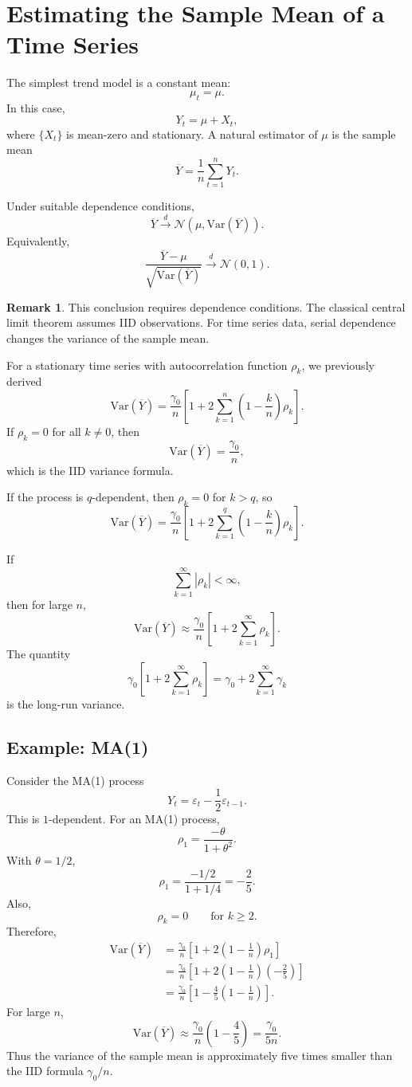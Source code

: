 \documentclass[12pt,oneside]{book}
\numberwithin{equation}{section}
\theoremstyle{definition}
\newtheorem{remark}{Remark}[section]
\theoremstyle{plain}
\theoremstyle{remark}
\newcommand{\Var}{\mathrm{Var}}
\newcommand{\convd}{\overset{d}{\to}}
\newcommand{\Normal}{\mathcal{N}}
\begin{document}
\section{Estimating the Sample Mean of a Time Series}

The simplest trend model is a constant mean:
\[
\mu_t=\mu.
\]
In this case,
\[
Y_t=\mu+X_t,
\]
where $\{X_t\}$ is mean-zero and stationary. A natural estimator of $\mu$ is the sample mean
\[
\overline{Y}
=
\frac{1}{n}\sum_{t=1}^nY_t.
\]

Under suitable dependence conditions,
\[
\overline{Y}\convd \Normal(\mu,\Var(\overline{Y})).
\]
Equivalently,
\[
\frac{\overline{Y}-\mu}{\sqrt{\Var(\overline{Y})}}
\convd
\Normal(0,1).
\]

\begin{remark}
This conclusion requires dependence conditions. The classical central limit theorem assumes IID observations. For time series data, serial dependence changes the variance of the sample mean.
\end{remark}

For a stationary time series with autocorrelation function $\rho_k$, we previously derived
\[
\Var(\overline{Y})
=
\frac{\gamma_0}{n}
\left[
1+2\sum_{k=1}^n
\left(1-\frac{k}{n}\right)\rho_k
\right].
\]
If $\rho_k=0$ for all $k\neq 0$, then
\[
\Var(\overline{Y})
=
\frac{\gamma_0}{n},
\]
which is the IID variance formula.

If the process is $q$-dependent, then $\rho_k=0$ for $k>q$, so
\[
\Var(\overline{Y})
=
\frac{\gamma_0}{n}
\left[
1+2\sum_{k=1}^{q}
\left(1-\frac{k}{n}\right)\rho_k
\right].
\]

If
\[
\sum_{k=1}^{\infty}|\rho_k|<\infty,
\]
then for large $n$,
\[
\Var(\overline{Y})
\approx
\frac{\gamma_0}{n}
\left[
1+2\sum_{k=1}^{\infty}\rho_k
\right].
\]
The quantity
\[
\gamma_0\left[
1+2\sum_{k=1}^{\infty}\rho_k
\right]
=
\gamma_0+2\sum_{k=1}^{\infty}\gamma_k
\]
is the long-run variance.

\subsection*{Example: MA(1)}

Consider the MA(1) process
\[
Y_t=\varepsilon_t-\frac{1}{2}\varepsilon_{t-1}.
\]
This is $1$-dependent. For an MA(1) process,
\[
\rho_1
=
\frac{-\theta}{1+\theta^2}.
\]
With $\theta=1/2$,
\[
\rho_1
=
\frac{-1/2}{1+1/4}
=
-\frac{2}{5}.
\]
Also,
\[
\rho_k=0
\qquad
\text{for } k\geq 2.
\]
Therefore,
\begin{align*}
\Var(\overline{Y})
&=
\frac{\gamma_0}{n}
\left[
1+2\left(1-\frac{1}{n}\right)\rho_1
\right] \\
&=
\frac{\gamma_0}{n}
\left[
1+2\left(1-\frac{1}{n}\right)\left(-\frac{2}{5}\right)
\right] \\
&=
\frac{\gamma_0}{n}
\left[
1-\frac{4}{5}\left(1-\frac{1}{n}\right)
\right].
\end{align*}
For large $n$,
\[
\Var(\overline{Y})
\approx
\frac{\gamma_0}{n}
\left(1-\frac{4}{5}\right)
=
\frac{\gamma_0}{5n}.
\]
Thus the variance of the sample mean is approximately five times smaller than the IID formula $\gamma_0/n$.
\end{document}
